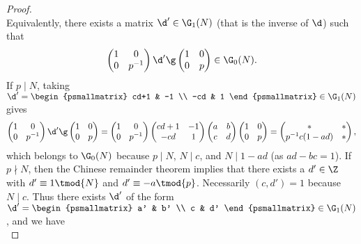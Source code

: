 \begin{proof}
\[      \]
      Equivalently, there exists a matrix $\d' \in \G_{1}(N)$ (that is the inverse of $\d$) such that
      \[
        \begin{pmatrix} 1 & 0 \\ 0 & p^{-1} \end{pmatrix}\d'\g\begin{pmatrix} 1 & 0 \\ 0 & p \end{pmatrix} \in \G_{0}(N).
      \]
      If $p \mid N$, taking $\d' = \begin{psmallmatrix} cd+1 & -1 \\ -cd & 1 \end{psmallmatrix} \in \G_{1}(N)$ gives
      \[
        \begin{pmatrix} 1 & 0 \\ 0 & p^{-1} \end{pmatrix}\d'\g\begin{pmatrix} 1 & 0 \\ 0 & p \end{pmatrix} = \begin{pmatrix} 1 & 0 \\ 0 & p^{-1} \end{pmatrix}\begin{pmatrix} cd+1 & -1 \\ -cd & 1 \end{pmatrix}\begin{pmatrix} a & b \\ c & d \end{pmatrix}\begin{pmatrix} 1 & 0 \\ 0 & p \end{pmatrix} = \begin{pmatrix} \ast & \ast \\ p^{-1}c(1-ad) & \ast \end{pmatrix},
      \]
      which belongs to $\G_{0}(N)$ because $p \mid N$, $N \mid c$, and $N \mid 1-ad$ (as $ad-bc = 1$). If $p \nmid N$, then the Chinese remainder theorem implies that there exists a $d' \in \Z$ with $d' \equiv 1 \tmod{N}$ and $d' \equiv -a \tmod{p}$. Necessarily $(c,d') = 1$ because $N \mid c$. Thus there exists $\d'$ of the form $\d' = \begin{psmallmatrix} a' & b' \\ c & d' \end{psmallmatrix} \in \G_{1}(N)$, and we have
      \[
\]
\end{proof}
